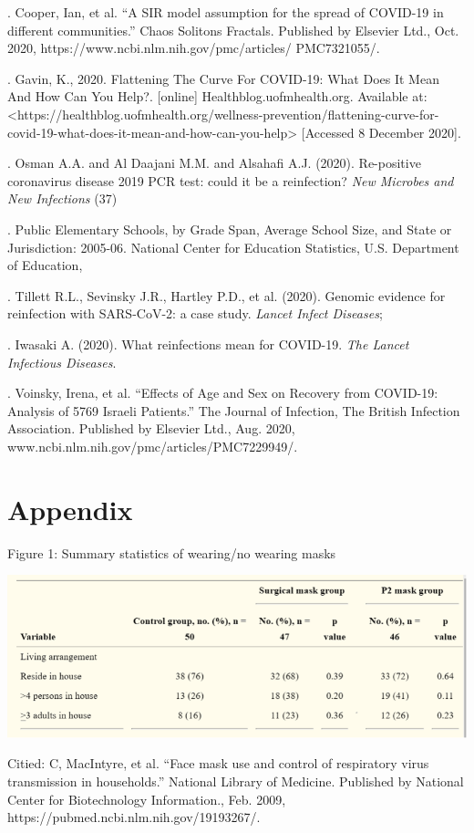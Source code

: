\documentclass[11pt,a4paper]{article}
\begin{document}
\medskip {}. Cooper, Ian, et al. “A SIR model assumption for the spread of COVID-19 in different communities.” Chaos Solitons Fractals. Published by Elsevier Ltd., Oct. 2020, https://www.ncbi.nlm.nih.gov/pmc/articles/
PMC7321055/. 


\medskip {}. Gavin, K., 2020. Flattening The Curve For COVID-19: What Does It Mean And How Can You Help?. [online] Healthblog.uofmhealth.org. Available at: <https://healthblog.uofmhealth.org/wellness-prevention/flattening-curve-for-covid-19-what-does-it-mean-and-how-can-you-help> [Accessed 8 December 2020].

\medskip {}. Osman A.A. and Al Daajani M.M. and Alsahafi A.J. (2020). Re-positive coronavirus disease 2019 PCR test: could it be a reinfection? {\it New Microbes and New Infections} (37)

\medskip {}. Public Elementary Schools, by Grade Span, Average School Size, and State or Jurisdiction: 2005-06. National Center for Education Statistics, U.S. Department of Education,

\medskip {}. Tillett R.L., Sevinsky J.R., Hartley P.D., et al. (2020). Genomic evidence for reinfection with SARS-CoV-2: a case study. {\it Lancet Infect Diseases}; 

\medskip {}. Iwasaki A. (2020). What reinfections mean for COVID-19. {\it The Lancet Infectious Diseases}. 

\medskip {}. Voinsky, Irena, et al. “Effects of Age and Sex on Recovery from COVID-19: Analysis of 5769 Israeli Patients.” The Journal of Infection, The British Infection Association. Published by Elsevier Ltd., Aug. 2020, www.ncbi.nlm.nih.gov/pmc/articles/PMC7229949/. 





\newpage
\section*{Appendix}

  \begin{center}
 	Figure 1: Summary statistics of wearing/no wearing masks
 \end{center}
\begin{center} 
	\includegraphics[scale=0.9]{maskov.png}
\end{center}
Citied: C, MacIntyre, et al. “Face mask use and control of respiratory virus transmission in households.” National Library of Medicine. Published by National Center for Biotechnology Information., 
Feb. 2009, https://pubmed.ncbi.nlm.nih.gov/19193267/. 
\end{document}
